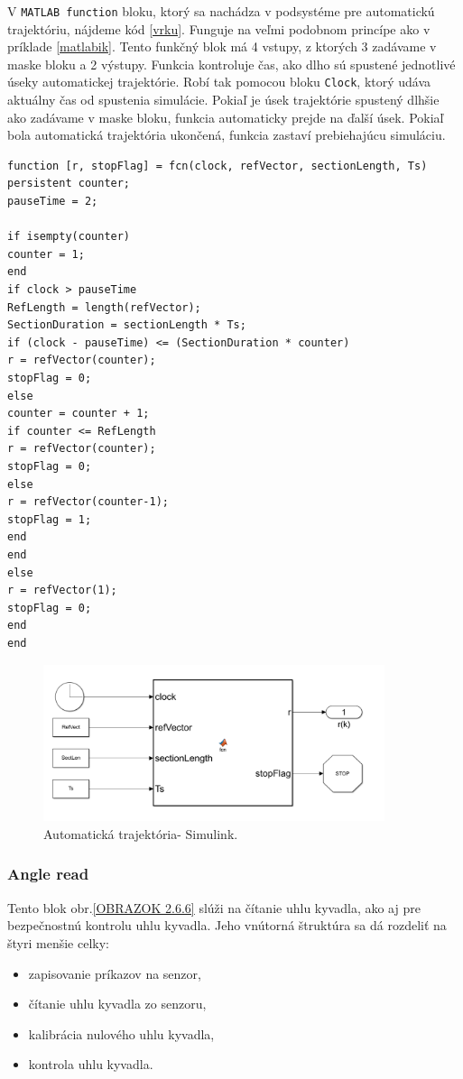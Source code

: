 V \verb|MATLAB function| bloku, ktorý sa nachádza v podsystéme pre automatickú trajektóriu, nájdeme kód \ref{vrku}. Funguje na veľmi podobnom princípe ako v príklade \ref{matlabik}. Tento funkčný blok má 4 vstupy, z ktorých 3 zadávame v maske bloku a 2 výstupy. Funkcia kontroluje čas, ako dlho sú spustené jednotlivé úseky automatickej trajektórie. Robí tak pomocou bloku \verb|Clock|, ktorý udáva aktuálny čas od spustenia simulácie. Pokiaľ je úsek trajektórie spustený dlhšie ako zadávame v maske bloku, funkcia automaticky prejde na ďalší úsek. Pokiaľ bola automatická trajektória ukončená, funkcia zastaví prebiehajúcu simuláciu. 



\begin{lstlisting}[caption={MATLAB function blok autiomatická trajektoria.},captionpos=b, label=vrku]
function [r, stopFlag] = fcn(clock, refVector, sectionLength, Ts)
persistent counter;
pauseTime = 2;

if isempty(counter)
counter = 1;
end
if clock > pauseTime
RefLength = length(refVector);
SectionDuration = sectionLength * Ts;
if (clock - pauseTime) <= (SectionDuration * counter)
r = refVector(counter);
stopFlag = 0;
else
counter = counter + 1;
if counter <= RefLength
r = refVector(counter);
stopFlag = 0;
else
r = refVector(counter-1);
stopFlag = 1; 
end
end
else
r = refVector(1);
stopFlag = 0;
end
end
\end{lstlisting}

\begin{figure}[!tbh]
	\centering
	\includegraphics[width=100mm]{obr/AutoSimul.png}
	\caption{Automatická trajektória- Simulink.}\label{OBRAZOK 2.6.66}
\end{figure}

\subsubsection{Angle read}

Tento blok obr.\ref{OBRAZOK 2.6.6} slúži na čítanie uhlu kyvadla, ako aj pre bezpečnostnú kontrolu uhlu kyvadla. Jeho vnútorná štruktúra sa dá rozdeliť na štyri menšie celky: 
\begin{itemize}
	\item zapisovanie príkazov na senzor,  
	\item čítanie uhlu kyvadla zo senzoru, 
	\item kalibrácia nulového uhlu kyvadla,
	\item kontrola uhlu kyvadla. 
\end{itemize}

